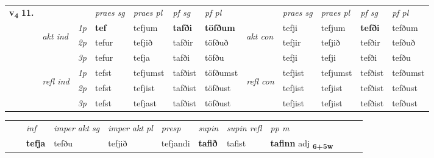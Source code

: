 \begin{tabular}{llllllllllll} \toprule
\multirow{4}{*}{{{\textbf{v{\textsubscript{4}}} \Large{\textbf{11.}}}}}  & &   &  \textit{praes sg}  & \textit{praes pl}  &\textit{ pf sg} & \textit{pf pl} &  &  \textit{praes sg}  & \textit{praes pl}  & \textit{pf sg} & \textit{pf pl } \\*
	\cmidrule{4-7} \cmidrule{9-12}
 & \multirow{3}{*}{\begin{turn}{90}\textit{akt ind}\end{turn}} & {\textit{1p}} & \textbf{tef} & tefjum    & \textbf{tafði} & \textbf{töfðum} & \multirow{3}{*}{\begin{turn}{90}\textit{akt con}\end{turn}} &tefji & tefjum & \textbf{tefði} & tefðum\\*
& &  {\textit{2p}} &  tefur  & tefjið   & tafðir & töfðuð & & tefjir & tefjið & tefðir & tefðuð \\*
& &  {\textit{3p}} & tefur & tefja   & tafði & töfðu & & tefji & tefji& tefði & tefðu  \\*
\cmidrule{4-7} \cmidrule{9-12}
 &\multirow{3}{*}{\begin{turn}{90}\textit{refl ind}\end{turn}} & {\textit{1p}} & tefst & tefjumst    & tafðist & töfðumst & \multirow{3}{*}{\begin{turn}{90}\textit{refl con}\end{turn}}  &tefjist & tefjumst & tefðist & tefðumst\\*
 &&  {\textit{2p}} &  tefst  & tefjist   & tafðist & töfðust & &tefjist & tefjist & tefðist & tefðust \\*
& &  {\textit{3p}} & tefst & tefjast   & tafðist & töfðust & & tefjist & tefjist& tefðist & tefðust  \\*
\cmidrule{4-7} \cmidrule{9-12}
\end{tabular}


\begin{tabular}{llllllllllll}
 & & \textit{inf} & \textit{imper akt sg} & \textit{imper akt pl}   & \textit{presp} & \textit{supin} & \textit{supin refl} & \textit{pp m}     \\*
  & & \textbf{tefja} & tefðu  & tefjið   & tefjandi &  \textbf{tafið} & tafist & \textbf{tafinn} adj \textbf{\textsubscript{6+5w}} \\*
\cmidrule{1-12}
\end{tabular}



